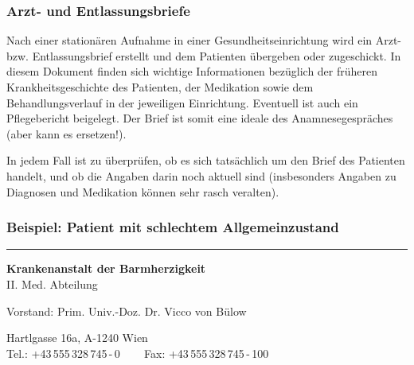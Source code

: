 \subsubsection{Arzt- und Entlassungsbriefe}

Nach einer stationären Aufnahme in einer
Gesundheitseinrichtung wird ein Arzt- bzw. Entlassungsbrief
erstellt und dem Patienten übergeben oder zugeschickt. In
diesem Dokument finden sich wichtige Informationen bezüglich
der früheren Krankheitsgeschichte des Patienten, der
Medikation sowie dem Behandlungsverlauf in der jeweiligen
Einrichtung. Eventuell ist auch ein Pflegebericht beigelegt.
Der Brief ist somit eine ideale  des
Anamnesegespräches (aber kann es  ersetzen!).

In jedem Fall ist zu überprüfen, ob es sich tatsächlich um
den Brief des Patienten handelt, und ob die Angaben darin
noch aktuell sind (insbesonders Angaben zu Diagnosen und
Medikation können sehr rasch veralten).

\subsubsection{Beispiel: Patient mit schlechtem
Allgemeinzustand}

\hrule

\vspace{1em}

\begin{center}\sffamily
 \textbf{Krankenanstalt der Barmherzigkeit} 
 \\II. Med. Abteilung 
 
Vorstand: Prim. Univ.-Doz. Dr. Vicco von Bülow
 
{\scriptsize Hartlgasse 16a, A-1240 Wien
\\
Tel.: +43\,555\,328\,745\,-\,0 ~~~ Fax: +43\,555\,328\,745\,-\,100}
\end{center}

